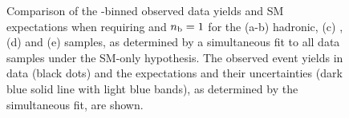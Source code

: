 \begin{figure}[t!]
\begin{center}
{    } 
    \caption{\label{fig:best-fit-ge4j1b} Comparison of the
      \scalht-binned observed data yields and SM expectations when
      requiring \njethigh and $n_{\text{b}} = 1$ for the (a-b) hadronic, (c)
      \mj, (d) \mmj and (e) \gj samples, as determined by a
      simultaneous fit to all data samples under the SM-only
      hypothesis. The observed event yields in data (black dots) and
      the expectations and their uncertainties (dark blue solid line
      with light blue bands), as determined by the simultaneous fit,
      are shown. 
      }
  \end{center}
\end{figure}

